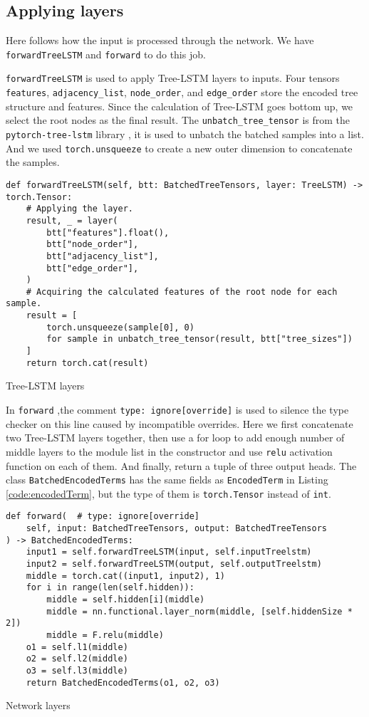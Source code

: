 \subsection{Applying layers}
Here follows how the input is processed through the network. We have \texttt{forwardTreeLSTM} and \texttt{forward} to do this job.

\texttt{forwardTreeLSTM} is used to apply Tree-LSTM layers to inputs. Four tensors \texttt{features}, \texttt{adjacency\_list}, \texttt{node\_order}, and \texttt{edge\_order} store the encoded tree structure and features.
Since the calculation of Tree-LSTM goes bottom up, we select the root nodes as the final result. The \texttt{unbatch\_tree\_tensor} is from the \texttt{pytorch-tree-lstm} library \cite{pytorch-tree-lstm}, it is used to unbatch the batched samples into a list. And we used \texttt{torch.unsqueeze} to create a new outer dimension to concatenate the samples.
\begin{listing}[H]
\begin{verbatim}
def forwardTreeLSTM(self, btt: BatchedTreeTensors, layer: TreeLSTM) -> torch.Tensor:
    # Applying the layer.
    result, _ = layer(
        btt["features"].float(),
        btt["node_order"],
        btt["adjacency_list"],
        btt["edge_order"],
    )
    # Acquiring the calculated features of the root node for each sample.
    result = [
        torch.unsqueeze(sample[0], 0)
        for sample in unbatch_tree_tensor(result, btt["tree_sizes"])
    ]
    return torch.cat(result)
\end{verbatim}
\caption{Tree-LSTM layers}
\end{listing}

In \texttt{forward} ,the comment \texttt{type: ignore[override]} is used to silence the type checker on this line caused by incompatible overrides. Here we first concatenate two Tree-LSTM layers together, then use a for loop to add enough number of middle layers to the module list in the constructor and use \texttt{relu} activation function on each of them. And finally, return a tuple of three output heads. The class \texttt{BatchedEncodedTerms} has the same fields as \texttt{EncodedTerm} in Listing \ref{code:encodedTerm}, but the type of them is \texttt{torch.Tensor} instead of \texttt{int}.

\begin{listing}[H]
\begin{verbatim}
def forward(  # type: ignore[override]
    self, input: BatchedTreeTensors, output: BatchedTreeTensors
) -> BatchedEncodedTerms:
    input1 = self.forwardTreeLSTM(input, self.inputTreelstm)
    input2 = self.forwardTreeLSTM(output, self.outputTreelstm)
    middle = torch.cat((input1, input2), 1)
    for i in range(len(self.hidden)):
        middle = self.hidden[i](middle)
        middle = nn.functional.layer_norm(middle, [self.hiddenSize * 2])
        middle = F.relu(middle)
    o1 = self.l1(middle)
    o2 = self.l2(middle)
    o3 = self.l3(middle)
    return BatchedEncodedTerms(o1, o2, o3)
\end{verbatim}
\caption{Network layers}
\end{listing}

